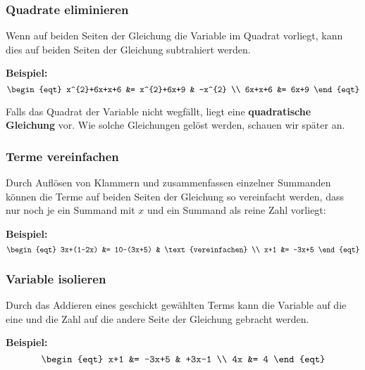 \subsubsection{Quadrate eliminieren}

Wenn auf beiden Seiten der Gleichung die Variable im Quadrat vorliegt, kann dies auf beiden Seiten der Gleichung subtrahiert werden.

\begin{example}
  \textbf{Beispiel:}
  \[\begin{eqt}
    x^{2}+6x+x+6 &= x^{2}+6x+9 & -x^{2} \\
          6x+x+6 &= 6x+9
  \end{eqt}\]
\end{example}

Falls das Quadrat der Variable nicht wegfällt, liegt eine \textbf{quadratische Gleichung} vor. Wie solche Gleichungen gelöst werden, schauen wir später an.

\subsubsection{Terme vereinfachen}

Durch Auflösen von Klammern und zusammenfassen einzelner Summanden können die Terme auf beiden Seiten der Gleichung so vereinfacht werden, dass nur noch je ein Summand mit $x$ und ein Summand als reine Zahl vorliegt:

\begin{example}
  \textbf{Beispiel:}
  \[\begin{eqt}
    3x+(1-2x) &= 10-(3x+5) & \text{vereinfachen} \\
          x+1 &= -3x+5
  \end{eqt}\]
\end{example}

\subsubsection{Variable isolieren}

Durch das Addieren eines geschickt gewählten Terms kann die Variable auf die eine und die Zahl auf die andere Seite der Gleichung gebracht werden.

\begin{example}
  \textbf{Beispiel:}
  \[\begin{eqt}
    x+1 &= -3x+5  & +3x-1 \\
     4x &= 4
  \end{eqt}\]
\end{example}

